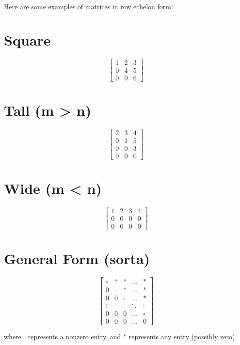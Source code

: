 \documentclass[
  letterpaper,
  DIV=11,
  numbers=noendperiod]{scrreprt}
\begin{document}
Here are some examples of matrices in row echelon form:

\chapter{Square}

\[
\begin{bmatrix}
    1 & 2 & 3 \\
    0 & 4 & 5 \\
    0 & 0 & 6 
\end{bmatrix}
\]

\chapter{Tall (m \textgreater{} n)}

\[
\begin{bmatrix}
    2 & 3 & 4 \\
    0 & 1 & 5 \\
    0 & 0 & 3 \\
    0 & 0 & 0
\end{bmatrix}
\]

\chapter{Wide (m \textless{} n)}

\[
\begin{bmatrix}
  1 & 2 & 3 & 4 \\
  0 & 0 & 0 & 0 \\
  0 & 0 & 0 & 0
\end{bmatrix}
\]

\chapter{General Form (sorta)}

\[
\begin{bmatrix}
    \square & * & * & \dots & * \\
    0 & \square & * & \dots & * \\
    0 & 0 & \square & \dots & * \\
    \vdots & \vdots & \vdots & \ddots & \vdots \\
    0 & 0 & 0 & \dots & \square \\
    0 & 0 & 0 & \dots & 0
\end{bmatrix}
\]

where \(\square\) represents a nonzero entry, and \(*\) represents any
entry (possibly zero).
\end{document}
